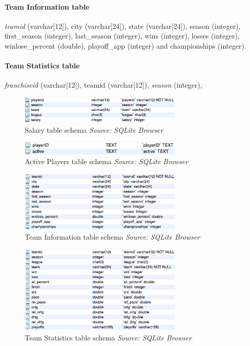 \paragraph{Team Information table}\textit{teamid} (varchar[12]), city (varchar[24]), state (varchar[24]), season (integer), first_season (integer), last_season (integer), wins (integer), losses (integer), winlose_percent (double), playoff_app (integer) and championships (integer).

\paragraph{Team Statistics table}\textit{franchiseid} (varchar[12]), teamid (varchar[12]), \textit{season} (integer), 

\begin{figure}[h!]
	\begin{center}
		\includegraphics[width=0.7\textwidth]{./images/salary}
		\caption{Salary table schema \textit{Source: SQLite Browser}}
		\label{fig:411-4}
	\end{center}
\end{figure}

\begin{figure}[h!]
	\begin{center}
		\includegraphics[width=0.7\textwidth]{./images/activeplayers}
		\caption{Active Players table schema \textit{Source: SQLite Browser}}
		\label{fig:411-5}
	\end{center}
\end{figure}

\begin{figure}[h!]
	\begin{center}
		\includegraphics[width=0.7\textwidth]{./images/teaminfo}
		\caption{Team Information table schema \textit{Source: SQLite Browser}}
		\label{fig:411-6}
	\end{center}
\end{figure}

\begin{figure}[h!]
	\begin{center}
		\includegraphics[width=0.7\textwidth]{./images/teamstats}
		\caption{Team Statistics table schema \textit{Source: SQLite Browser}}
		\label{fig:411-7}
	\end{center}
\end{figure}